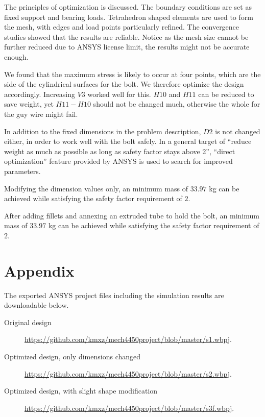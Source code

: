 \documentclass[a4paper,14pt]{extarticle}
\begin{document}
The principles of optimization is discussed. The boundary conditions are set as fixed support and bearing loads. Tetrahedron shaped elements are used to form the mesh, with edges and load points particularly refined. The convergence studies showed that the results are reliable. Notice as the mesh size cannot be further reduced due to ANSYS license limit, the results might not be accurate enough.

We found that the maximum stress is likely to occur at four points, which are the side of the cylindrical surfaces for the bolt. We therefore optimize the design accordingly. Increasing $V3$ worked well for this. $H10$ and $H11$ can be reduced to save weight, yet $H11 - H10$ should not be changed much, otherwise the whole for the guy wire might fail.

In addition to the fixed dimensions in the problem description, $D2$ is not changed either, in order to work well with the bolt safely. In a general target of ``reduce weight as much as possible as long as safety factor stays above 2'', ``direct optimization'' feature provided by ANSYS is used to search for improved parameters.

Modifying the dimension values only, an minimum mass of $33.97$ kg can be achieved while satisfying the safety factor requirement of $2$. 

After adding fillets and annexing an extruded tube to hold the bolt, an minimum mass of $33.97$ kg can be achieved while satisfying the safety factor requirement of $2$. 
\section{Appendix}
The exported ANSYS project files including the simulation results are downloadable below. 
\begin{description}
\item[Original design] \url{https://github.com/kmxz/mech4450project/blob/master/s1.wbpj}.
\item[Optimized design, only dimensions changed] \url{https://github.com/kmxz/mech4450project/blob/master/s2.wbpj}.
\item[Optimized design, with slight shape modification] \url{https://github.com/kmxz/mech4450project/blob/master/s3f.wbpj}.
\end{description}
\end{document}
